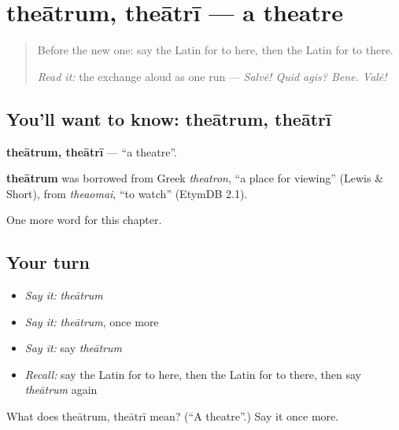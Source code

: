 \section[theātrum, theātrī]{theātrum, theātrī — a theatre}

\label{lesson:LA-C115-theatrum}



\begin{quote}
Before the new one: say the Latin for to here, then the Latin for to there.

\emph{Read it:} the exchange aloud as one run — \emph{Salvē! Quid agis? Bene. Valē!}
\end{quote}

\subsection*{You'll want to know: theātrum, theātrī}
\textbf{theātrum, theātrī} — \textquotedblleft{}a theatre\textquotedblright{}.

\begin{cousinweb}
\textbf{theātrum} was borrowed from Greek \emph{theatron}, \textquotedblleft{}a place for viewing\textquotedblright{} (Lewis \& Short), from \emph{theaomai}, \textquotedblleft{}to watch\textquotedblright{} (EtymDB 2.1).
\end{cousinweb}

\begin{grammarlens}[title={What you've built}]
One more word for this chapter.
\end{grammarlens}

\subsection*{Your turn}
\begin{itemize}
\raggedright
  \item \emph{Say it:} \emph{theātrum}
  \item \emph{Say it:} \emph{theātrum}, once more
  \item \emph{Say it:} say \emph{theātrum}
  \item \emph{Recall:} say the Latin for to here, then the Latin for to there, then say \emph{theātrum} again
\end{itemize}

\begin{tcolorbox}[breakable,colback=teal!4,colframe=teal!35!black,title={Before you move on}]
What does theātrum, theātrī mean? (\textquotedblleft{}A theatre\textquotedblright{}.) Say it once more.
\end{tcolorbox}
